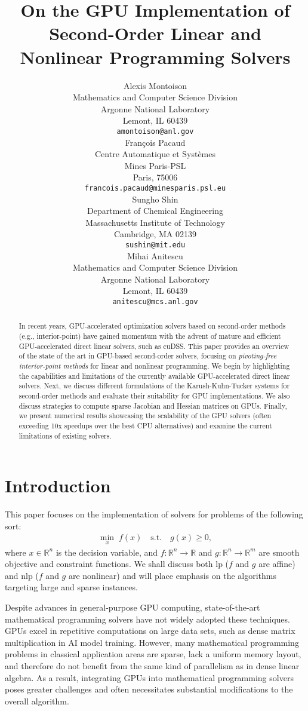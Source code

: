 \documentclass{article}
\title{On the GPU Implementation of Second-Order Linear and Nonlinear Programming Solvers}
\author{%
  Alexis Montoison\\
  Mathematics and Computer Science Division\\
  Argonne National Laboratory\\
  Lemont, IL 60439\\
  \texttt{amontoison@anl.gov}\\
  \And
  Fran\c{c}ois Pacaud\\
  Centre Automatique et Systèmes\\
  Mines Paris-PSL\\
  Paris, 75006 \\
  \texttt{francois.pacaud@minesparis.psl.eu}\\
  \And
  Sungho Shin\\
  Department of Chemical Engineering\\
  Massachusetts Institute of Technology\\
  Cambridge, MA 02139\\
  \texttt{sushin@mit.edu}\\
  \And
  Mihai Anitescu\\
  Mathematics and Computer Science Division\\
  Argonne National Laboratory\\
  Lemont, IL 60439\\
  \texttt{anitescu@mcs.anl.gov}\\
}
\begin{document}
\maketitle


\begin{abstract}
In recent years, GPU-accelerated optimization solvers based on second-order methods (e.g., interior-point) have gained momentum with the advent of mature and efficient GPU-accelerated direct linear solvers, such as cuDSS. This paper provides an overview of the state of the art in GPU-based second-order solvers, focusing on \emph{pivoting-free interior-point methods} for linear and nonlinear programming. We begin by highlighting the capabilities and limitations of the currently available GPU-accelerated direct linear solvers. Next, we discuss different formulations of the Karush-Kuhn-Tucker systems for second-order methods and evaluate their suitability for GPU implementations. We also discuss strategies to compute sparse Jacobian and Hessian matrices on GPUs. Finally, we present numerical results showcasing the scalability of the GPU solvers (often exceeding 10x speedups over the best CPU alternatives) and examine the current limitations of existing solvers.
\end{abstract}

\section{Introduction}\label{eqn:intro}

This paper focuses on the implementation of solvers for problems of the following sort:
\begin{align}\label{eqn:opt}
  \min_{x } \; f(x) \quad \text{s.t.} \quad g(x) \geq 0,
\end{align}
where \(x \in \mathbb{R}^n\) is the decision variable, and \(f: \mathbb{R}^n \to \mathbb{R}\) and \(g: \mathbb{R}^n \to \mathbb{R}^m\) are smooth objective and constraint functions.
We shall discuss both \gls*{lp} ($f$ and $g$ are affine) and \gls*{nlp} ($f$ and $g$ are nonlinear) and will place emphasis on the algorithms targeting large and sparse instances.

Despite advances in general-purpose GPU computing, state-of-the-art mathematical programming solvers have not widely adopted these techniques. GPUs excel in repetitive computations on large data sets, such as dense matrix multiplication in AI model training. However, many mathematical programming problems in classical application areas are sparse, lack a uniform memory layout, and therefore do not benefit from the same kind of parallelism as in dense linear algebra. As a result, integrating GPUs into mathematical programming solvers poses greater challenges and often necessitates substantial modifications to the overall algorithm.
\end{document}
